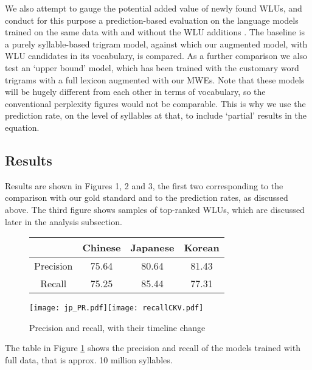 \documentclass[a4]{article}
\begin{document}
We also attempt to gauge the potential added value of newly found WLUs, and conduct for this purpose a prediction-based evaluation on the language models trained on the same data with and without the WLU additions \cite{Wester03_masterThesis}. The baseline is a purely syllable-based trigram model, against which our augmented model, with WLU candidates in its vocabulary, is compared. As a further comparison we also test an `upper bound' model, which has been trained with the customary word trigrams with a full lexicon augmented with our MWEs. Note that these models will be hugely different from each other in terms of vocabulary, so the conventional perplexity figures would not be comparable. This is why we use the prediction rate, on the level of syllables at that, to include `partial' results in the equation.%


\subsection{Results}

Results are shown in Figures 1, 2 and 3, the first two corresponding to the comparison with our gold standard and to the prediction rates, as discussed above. The third figure shows samples of top-ranked WLUs, which are discussed later in the analysis subsection.

\begin{figure}[t]

\begin{tabular}{c|c |c |c }
\centering
& Chinese & Japanese & Korean\\
\hline 
Precision & 75.64 & 80.64 & 81.43\\
\hline
Recall & 75.25  & 85.44 & 77.31\\

\end{tabular}

\hspace{2mm}

\texttt{[image: jp\_PR.pdf]}\texttt{[image: recallCKV.pdf]}

\label{PR}
\caption{Precision and recall, with their timeline change}
\end{figure}

The table in Figure \ref{PR} shows the precision and recall of the models trained with full data, that is approx. 10 million syllables. 
\end{document}
